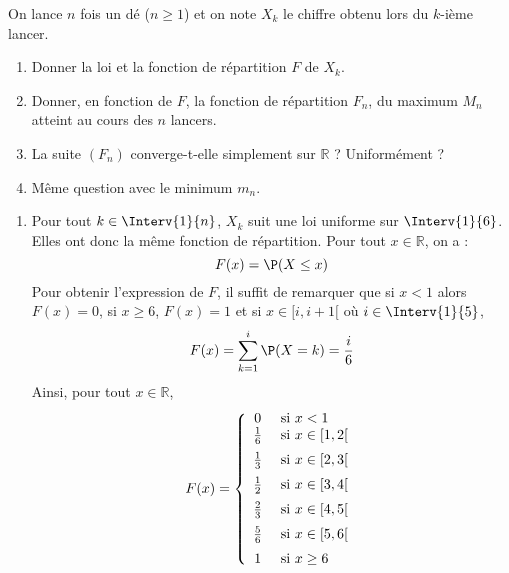 \documentclass[a4paper,10pt]{report}
\begin{document}
\begin{Exa} On lance $n$ fois un dé ($n \geq 1$) et on note $X_k$ le chiffre obtenu lors du $k$-ième lancer.
\begin{enumerate}
\item Donner la loi et la fonction de répartition $F$ de $X_k$.
\item Donner, en fonction de $F$, la fonction de répartition $F_n$, du maximum $M_n$ atteint au cours des $n$ lancers.
\item La suite $(F_n)$ converge-t-elle simplement sur $\mathbb{R}$ ? Uniformément ?
\item Même question avec le minimum $m_n$.
\end{enumerate}
\end{Exa}

\corr \begin{enumerate}
\item Pour tout $k \in \Interv{1}{n}$, $X_k$ suit une loi uniforme sur $\Interv{1}{6}$. Elles ont donc la même fonction de répartition. Pour tout $x \in \mathbb{R}$, on a :
$$ F(x) = \P(X \leq x)$$
Pour obtenir l'expression de $F$, il suffit de remarquer que si $x<1$ alors $F(x)=0$, si $x \geq 6$, $F(x)=1$ et si $x \in [i,i+1[$ où $i \in \Interv{1}{5}$,
$$ F(x) = \sum_{k=1}^{i} \P(X = k) = \dfrac{i}{6}$$
Ainsi, pour tout $x \in \mathbb{R}$,
$$ F(x) = \left\lbrace \begin{array}{cl}
0 & \hbox{ si } x<1\\
\tfrac{1}{6} & \hbox{ si } x \in [1,2[ \\[0.2cm]
\tfrac{1}{3} & \hbox{ si } x \in [2,3[ \\[0.2cm]
\tfrac{1}{2} & \hbox{ si } x \in [3,4[ \\[0.2cm]
\tfrac{2}{3} & \hbox{ si } x \in [4,5[ \\[0.2cm]
\tfrac{5}{6} & \hbox{ si } x \in [5,6[ \\[0.2cm]
1 & \hbox{ si } x \geq 6 \\
\end{array}\right.$$



\end{enumerate}
\end{document}
